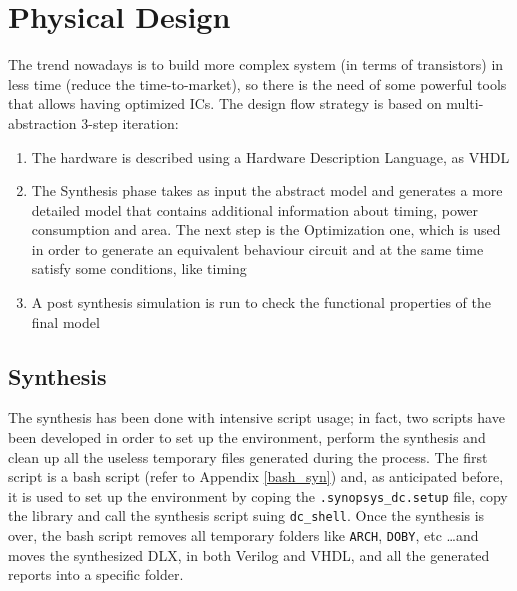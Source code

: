 \chapter{Physical Design}
The trend nowadays is to build more complex system (in terms of transistors) in less time (reduce the time-to-market), so there is the need of some powerful tools that allows having optimized ICs. The design flow strategy is based on multi-abstraction 3-step iteration:
\begin{enumerate}
	\item The hardware is described using a Hardware Description Language, as VHDL
	\item The Synthesis phase takes as input the abstract model and generates a more detailed model that contains additional information about timing, power consumption and area. The next step is the Optimization one, which is used in order to generate an equivalent behaviour circuit and at the same time satisfy some conditions, like timing
	\item A post synthesis simulation is run to check the functional properties of the final model
\end{enumerate}
\section{Synthesis}
\label{sec:syn_opt}
The synthesis has been done with intensive script usage; in fact, two scripts have been developed in order to set up the environment, perform the synthesis and clean up all the useless temporary files generated during the process.\newline\newline
The first script is a bash script (refer to Appendix \ref{bash_syn}) and, as anticipated before, it is used to set up the environment by coping the \texttt{.synopsys\_dc.setup} file, copy the library and call the synthesis script suing \texttt{dc\_shell}.
Once the synthesis is over, the bash script removes all temporary folders like \texttt{ARCH}, \texttt{DOBY}, etc \dots and moves the synthesized DLX, in both Verilog and VHDL, and all the generated reports into a specific folder.\newline\newline


